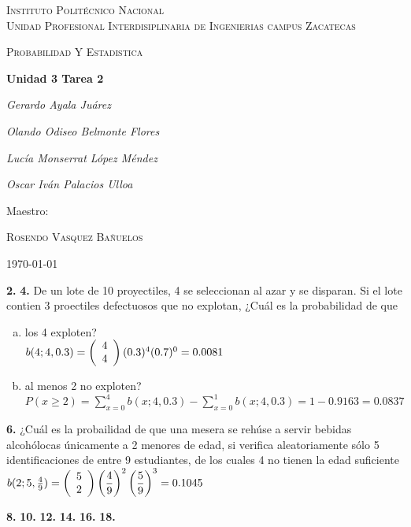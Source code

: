 \documentclass[12pt, letterpaper]{article}
\begin{document}
    \begin{titlepage}
        \centering
        {\scshape\LARGE Instituto Politécnico Nacional\\ Unidad Profesional Interdisiplinaria de Ingenierias campus Zacatecas\par}
        \vspace{1cm}
        {\scshape\Large Probabilidad Y Estadistica\par}
        \vspace{1.5cm}
        {\huge\bfseries Unidad 3 Tarea 2\par}
        \vspace{2cm}
        {\Large\itshape Gerardo Ayala Juárez\par}
        {\Large\itshape Olando Odiseo Belmonte Flores\par}
        {\Large\itshape Lucía Monserrat López Méndez\par}
        {\Large\itshape Oscar Iván Palacios Ulloa\par}
        \vfill
        Maestro:\par
        \textsc{
        Rosendo Vasquez Bañuelos}
        \vfill
        {\large \today \par}
    \end{titlepage}
    \textbf{2. }\vskip1cm
    \textbf{4. }De un lote de 10 proyectiles, 4 se seleccionan al azar y se disparan. Si el lote contien 3 proectiles
    defectuosos que no explotan, ¿Cuál es la probabilidad de que
    \begin{enumerate}[a)]
        \item los 4 exploten?\\
            $b(4;4,0.3)=
            \left(\begin{array}{c l}
                            4\\4
            \end{array}\right)
            (0.3)^4(0.7)^0=0.0081$
        \item al menos 2 no exploten?\\
            $P(x\geq 2)=\displaystyle\sum_{x=0}^{4}b(x;4,0.3)-\sum_{x=0}^{1}b(x;4,0.3)=1-0.9163=0.0837$
    \end{enumerate}\vskip1cm

    \textbf{6. }¿Cuál es la probailidad de que una mesera se rehúse a servir bebidas alcohólocas únicamente a 2 menores
    de edad, si verifica aleatoriamente sólo 5 identificaciones de entre 9 estudiantes, de los cuales 4 no tienen la
    edad suficiente\vskip0.3cm
        $b(2;5,\frac{4}{9})=
        \left(\begin{array}{c l}
                  5\\2
        \end{array}\right)
        \displaystyle\left(\frac{4}{9}\right)^2\left(\frac{5}{9}\right)^3=0.1045$\vskip1cm

    \textbf{8. }\vskip1cm
    \textbf{10. }\vskip1cm
    \textbf{12. }\vskip1cm
    \textbf{14. }\vskip1cm
    \textbf{16. }\vskip1cm
    \textbf{18. }\vskip1cm
\end{document}
